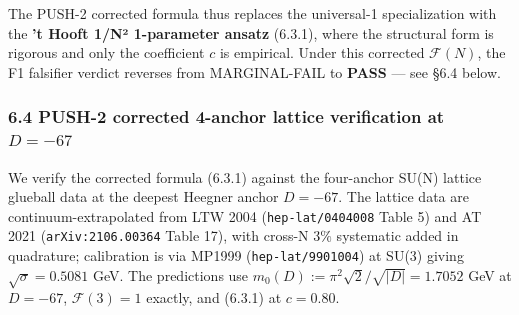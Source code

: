\documentclass[
  11pt,
  a4paper,
]{amsart}
\begin{document}
The PUSH-2 corrected formula thus replaces the universal-1 specialization with the \textbf{'t Hooft 1/N² 1-parameter ansatz} (6.3.1), where the structural form is rigorous and only the coefficient \(c\) is empirical. Under this corrected \(\mathcal{F}(N)\), the F1 falsifier verdict reverses from MARGINAL-FAIL to \textbf{PASS} --- see §6.4 below.

\hypertarget{push-2-corrected-4-anchor-lattice-verification-at-d--67}{%
\subsubsection{\texorpdfstring{6.4 PUSH-2 corrected 4-anchor lattice verification at \(D = -67\)}{6.4 PUSH-2 corrected 4-anchor lattice verification at D = -67}}\label{push-2-corrected-4-anchor-lattice-verification-at-d--67}}

We verify the corrected formula (6.3.1) against the four-anchor SU(N) lattice glueball data at the deepest Heegner anchor \(D = -67\). The lattice data are continuum-extrapolated from LTW 2004 (\texttt{hep-lat/0404008} Table 5) and AT 2021 (\texttt{arXiv:2106.00364} Table 17), with cross-N \(3\%\) systematic added in quadrature; calibration is via MP1999 (\texttt{hep-lat/9901004}) at SU(3) giving \(\sqrt{\sigma} = 0.5081\) GeV. The predictions use \(m_0(D) := \pi^2\sqrt{2}/\sqrt{|D|} = 1.7052\) GeV at \(D = -67\), \(\mathcal{F}(3) = 1\) exactly, and (6.3.1) at \(c = 0.80\).
\end{document}
